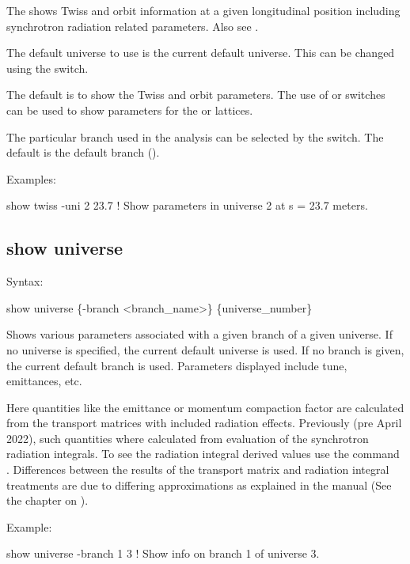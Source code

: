 {{{{{{{{{{The  shows Twiss and orbit information at a given longitudinal position
 including synchrotron radiation related parameters. Also see .

The default universe to use is the current default universe. This can be changed using the
 switch.

The default is to show the  Twiss and orbit parameters. The use of  or
 switches can be used to show parameters for the  or  lattices.

The particular branch used in the analysis can be selected by the  switch. The
default is the default branch ().

Examples:
\begin{example}
  show twiss -uni 2 23.7     ! Show parameters in universe 2 at s = 23.7 meters.
\end{example} 


\subsection{show universe}
\label{s:show.universe}

Syntax:
\begin{example}
  show universe \{-branch <branch_name>\} \{universe_number\}
\end{example}

Shows various parameters associated with a given branch of a given universe. If no universe is
specified, the current default universe is used. If no branch is given, the current default branch
is used. Parameters displayed include tune, emittances, etc. 

Here quantities like the emittance or momentum compaction factor are calculated from the transport
matrices with included radiation effects. Previously (pre April 2022), such quantities where
calculated from evaluation of the synchrotron radiation integrals. To see the radiation integral
derived values use the command  . Differences between the results
of the transport matrix and radiation integral treatments are due to differing approximations as
explained in the \bmad manual (See the chapter on ).

Example:
\begin{example}
  show universe -branch 1 3  ! Show info on branch 1 of universe 3.
\end{example}

}}}}}}}}}}
